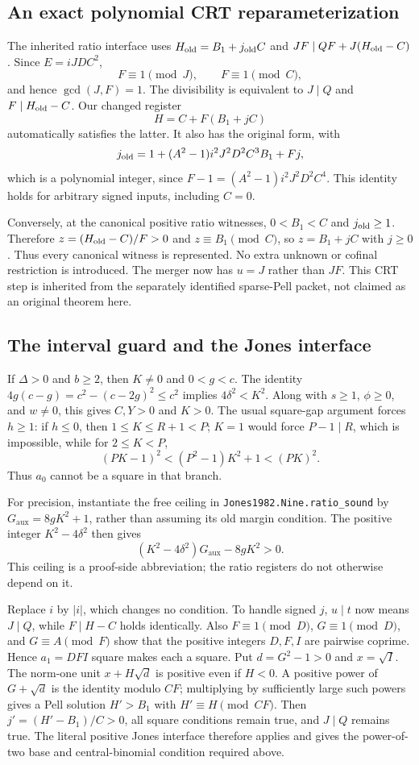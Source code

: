 \subsection{An exact polynomial CRT reparameterization}
The inherited ratio interface uses $H_{\rm old}=B_1+j_{\rm old}C$ and
$JF\mid QF+J(H_{\rm old}-C)$. Since $E=iJDC^2$,
\[
 F\equiv1\pmod J,\qquad F\equiv1\pmod C,
\]
and hence $\gcd(J,F)=1$. The divisibility is equivalent to
$J\mid Q$ and $F\mid H_{\rm old}-C$. Our changed register
\[
 H=C+F(B_1+jC)
\]
automatically satisfies the latter. It also has the original form, with
\[
 j_{\rm old}=1+(A^2-1)i^2J^2D^2C^3B_1+Fj,
\]
which is a polynomial integer, since $F-1=(A^2-1)i^2J^2D^2C^4$.
This identity holds for arbitrary signed inputs, including $C=0$.

Conversely, at the canonical positive ratio witnesses, $0<B_1<C$ and
$j_{\rm old}\ge1$. Therefore $z=(H_{\rm old}-C)/F>0$ and
$z\equiv B_1\pmod C$, so $z=B_1+jC$ with $j\ge0$. Thus every
canonical witness is represented. No extra unknown or cofinal restriction is
introduced. The merger now has $u=J$ rather than $JF$. This CRT step is
inherited from the separately identified sparse-Pell packet, not claimed as
an original theorem here.

\subsection{The interval guard and the Jones interface}
If $\Delta>0$ and $b\ge2$, then $K\ne0$ and
$0<g<c$. The identity $4g(c-g)=c^2-(c-2g)^2\le c^2$ implies
$4\delta^2<K^2$. Along with $s\ge1$, $\phi\ge0$, and $w\ne0$, this gives
$C,Y>0$ and $K>0$. The usual square-gap argument forces $h\ge1$:
if $h\le0$, then $1\le K\le R+1<P$; $K=1$ would force $P-1\mid R$,
which is impossible, while for $2\le K<P$,
\[
 (PK-1)^2<(P^2-1)K^2+1<(PK)^2.
\]
Thus $a_0$ cannot be a square in that branch.

For precision, instantiate the free ceiling in
\texttt{Jones1982.Nine.ratio\_sound} by
$G_{\mathrm{aux}}=8gK^2+1$, rather than assuming its old margin condition.
The positive integer $K^2-4\delta^2$ then gives
\[
 (K^2-4\delta^2)G_{\mathrm{aux}}-8gK^2>0.
\]
This ceiling is a proof-side abbreviation; the ratio registers do not
otherwise depend on it.

Replace $i$ by $|i|$, which changes no condition. To handle signed $j$,
$u\mid t$ now means $J\mid Q$, while $F\mid H-C$ holds identically. Also
$F\equiv1\pmod D$, $G\equiv1\pmod D$, and $G\equiv A\pmod F$ show
that the positive integers $D,F,I$ are pairwise coprime.
Hence $a_1=DFI$ square makes each a square. Put $d=G^2-1>0$ and
$x=\sqrt I$. The norm-one unit $x+H\sqrt d$ is positive even if $H<0$.
A positive power of $G+\sqrt d$ is the identity modulo $CF$; multiplying by
sufficiently large such powers gives a Pell solution $H'>B_1$ with
$H'\equiv H\pmod{CF}$. Then $j'=(H'-B_1)/C>0$, all square conditions
remain true, and $J\mid Q$ remains true. The literal positive Jones interface
therefore applies and gives the power-of-two base and central-binomial
condition required above.

